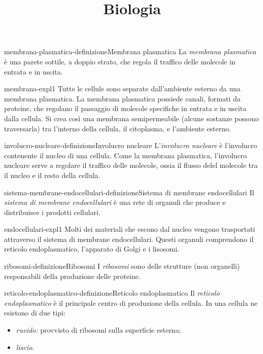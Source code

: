 \documentclass[preview]{standalone}
\begin{document}
\title{Biologia}
\genpage


\begin{snippetdefinition}{membrana-plasmatica-definizione}{Membrana plasmatica}
    La \textit{membrana plasmatica} è una parete sottile, a doppio strato,
    che regola il traffico delle molecole in entrata e in uscita.
\end{snippetdefinition}

\begin{snippet}{membrana-expl1}
    Tutte le cellule sono separate dall'ambiente esterno da
    una membrana plasmatica.
    La membrana plasmatica possiede canali, formati da proteine, che regolano il passaggio di molecole
    specifiche in entrata e in uscita dalla cellula.
    Si crea così una membrana semipermeabile (alcune sostanze possono traversarla) tra l'interno
    della cellula, il citoplasma, e l'ambiente esterno.
\end{snippet}

\begin{snippetdefinition}{involucro-nucleare-definizione}{Involucro nucleare}
    L'\textit{involucro nucleare} è l'involucro contenente il nucleo
    di una cellula. Come la membrana plasmatica, l'involucro nucleare serve a
    regolare il traffico delle molecole, ossia il flusso delel molecole tra il nucleo
    e il resto della cellula.
\end{snippetdefinition}

\begin{snippetdefinition}{sistema-membrane-endocellulari-definizione}{Sistema di membrane endocellulari}
    Il \textit{sistema di membrane endocellulari} è una rete di organuli che
    produce e distribuisce i prodotti cellulari.
\end{snippetdefinition}

\begin{snippet}{endocellulari-expl1}
    Molti dei materiali che escono dal nucleo vengono trasportati attraverso il sistema di
    membrane endocellulari.
    Questi organuli comprendono il reticolo endoplasmatico, l'apparato di Golgi e i lisosomi.
\end{snippet}

\begin{snippetdefinition}{ribosomi-definizione}{Ribosomi}
    I \textit{ribosomi} sono delle strutture (non organelli) responsabili della produzione delle proteine.
\end{snippetdefinition}

\begin{snippetdefinition}{reticolo-endoplasmatico-definizione}{Reticolo endoplasmatico}
    Il \textit{reticolo endoplasmatico} è il principale centro di produzione
    della cellula.
    In una cellula ne esistono di due tipi:
    \begin{itemize}
        \item \textit{ruvido:} provvisto di ribosomi sulla superficie esterna;
        \item \textit{liscio.}
    \end{itemize}
\end{snippetdefinition}
\end{document}
